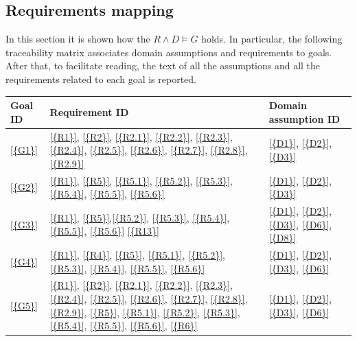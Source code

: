 \subsection{Requirements mapping}
In this section it is shown how the $R\land D \models G$ holds.
In particular, the following traceability matrix associates domain assumptions and requirements to goals.
After that, to facilitate reading, the text of all the assumptions and all the requirements related to each goal is reported.
\begin{table}[H]
      \centering
      \begin{tabular}{|l|p{8cm}|p{5cm}|}
            \hline
            \textbf{Goal ID} & \textbf{Requirement ID} & \textbf{Domain assumption ID}      \\\hline
            \ref{{G1}}       & \ref{{R1}}, \ref{{R2}}, \ref{{R2.1}}, \ref{{R2.2}}, \ref{{R2.3}}, \ref{{R2.4}}, \ref{{R2.5}}, \ref{{R2.6}}, \ref{{R2.7}}, \ref{{R2.8}}, \ref{{R2.9}}   & \ref{{D1}}, \ref{{D2}}, \ref{{D3}}                
             \\\hline
             
            \ref{{G2}}       & \ref{{R1}}, \ref{{R5}}, \ref{{R5.1}}, \ref{{R5.2}}, \ref{{R5.3}}, \ref{{R5.4}}, \ref{{R5.5}}, \ref{{R5.6}}
            & \ref{{D1}}, \ref{{D2}}, \ref{{D3}}     \\\hline
            
            \ref{{G3}}
            &
            \ref{{R1}}, \ref{{R5}},\ref{{R5.2}}, \ref{{R5.3}}, \ref{{R5.4}}, \ref{{R5.5}}, \ref{{R5.6}} \ref{{R13}}  
            & 
            \ref{{D1}}, \ref{{D2}}, \ref{{D3}}, \ref{{D6}}, \ref{{D8}}  \\\hline
            
            \ref{{G4}}
            & 
            \ref{{R1}}, \ref{{R4}}, \ref{{R5}}, \ref{{R5.1}}, \ref{{R5.2}}, \ref{{R5.3}}, \ref{{R5.4}}, \ref{{R5.5}}, \ref{{R5.6}}
            & 
            \ref{{D1}}, \ref{{D2}}, \ref{{D3}}, \ref{{D6}}                                \\\hline

            
            \ref{{G5}}       
            &
            \ref{{R1}}, \ref{{R2}}, \ref{{R2.1}}, \ref{{R2.2}}, \ref{{R2.3}}, \ref{{R2.4}}, \ref{{R2.5}}, \ref{{R2.6}}, \ref{{R2.7}}, \ref{{R2.8}}, \ref{{R2.9}}, \ref{{R5}}, \ref{{R5.1}}, \ref{{R5.2}}, \ref{{R5.3}}, \ref{{R5.4}}, \ref{{R5.5}}, \ref{{R5.6}}, \ref{{R6}}
            & 
            \ref{{D1}}, \ref{{D2}}, \ref{{D3}}, \ref{{D6}}                     
            \\\hline
            

\end{tabular}
\end{table}
